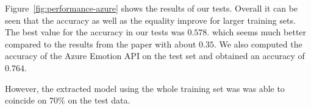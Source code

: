 \documentclass[a4paper,11pt]{article}
\begin{document}
        
        Figure~\ref{fig:performance-azure} shows the results of our tests. Overall it can be seen that the accuracy as well as the equality improve for larger training sets. The best value for the accuracy in our tests was $0.578$. which seems much better compared to the results from the paper with about $0.35$. We also computed the accuracy of the Azure Emotion API on the test set and obtained an accuracy of $0.764$.
        
        However, the extracted model using the whole training set was was able to coincide on $70\%$ on the test data. 
        
\end{document}
